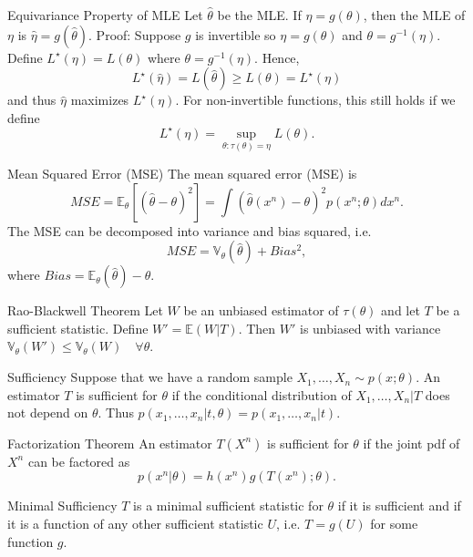 \documentclass[avery5371,grid]{flashcards}
\begin{document}
\begin{flashcard}[Theorem]{Equivariance Property of MLE}
\scriptsize
Let $\hat \theta$ be the MLE. If $\eta = g(\theta)$, then the MLE of $\eta$ is 
$\hat \eta = g(\hat \theta)$.
Proof: Suppose $g$ is invertible so $\eta = g(\theta)$ and $\theta = g^{-1}(\eta)$. Define
$L^\star(\eta) = L(\theta)$ where $\theta = g^{-1}(\eta)$. Hence,
\[
L^\star(\hat \eta)  = L(\hat \theta) \ge L(\theta) = L^{\star}(\eta)
\]
and thus $\hat \eta$ maximizes $L^\star(\eta)$. For non-invertible functions, this still holds if
we define
\[
L^\star(\eta) = \sup_{\theta: \tau(\theta) = \eta} L(\theta).
\]
\end{flashcard}

\begin{flashcard}[Theorem]{Mean Squared Error (MSE)}
The mean squared error (MSE) is
\[
MSE = \mathbb{E}_\theta \left[ (\hat \theta - \theta)^2 \right] = \int (\hat \theta(x^n) - \theta)^2 p(x^n;\theta) dx^n.
\]
The MSE can be decomposed into variance and bias squared, i.e.
\[
MSE = \mathbb{V}_\theta(\hat \theta) + Bias^2,
\]
where $Bias = \mathbb{E}_\theta(\hat \theta) - \theta$.
\end{flashcard}

\begin{flashcard}[Theorem]{Rao-Blackwell Theorem}
Let $W$ be an unbiased estimator of $\tau(\theta)$ and let $T$ be a sufficient statistic. Define
$W' = \mathbb{E}(W|T)$. Then $W'$ is unbiased with variance $\mathbb{V}_\theta (W') \le 
\mathbb{V}_\theta(W) \quad \forall \theta$.

\end{flashcard}

\begin{flashcard}[Definition]{Sufficiency}
Suppose that we have a random sample $X_1, \ldots, X_n \sim p(x;\theta)$. An estimator $T$
is sufficient for $\theta$ if the conditional distribution of $X_1,\ldots,X_n|T$ does not depend on $\theta$.
Thus $p(x_1,\ldots, x_n|t,\theta) = p(x_1, \ldots, x_n | t)$.
\end{flashcard}

\begin{flashcard}[Theorem]{Factorization Theorem}
An estimator $T(X^n)$ is sufficient for $\theta$ if the joint pdf of $X^n$ can be factored as
\[
p(x^n|\theta) = h(x^n) g \left(T(x^n);\theta \right).
\]
\end{flashcard}

\begin{flashcard}[Definition]{Minimal Sufficiency}
$T$ is a minimal sufficient statistic for $\theta$ if it is sufficient and
if it is a function of any other sufficient statistic $U$, i.e. $T=g(U)$ for some function $g$.
\end{flashcard}
\end{document}
